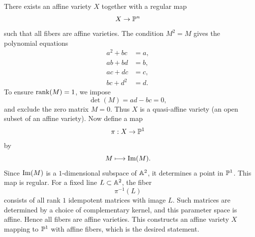 \begin{theorem}{
    There exists an affine variety $X$ together with a regular map
    \[
        X \to \pp^n
    \]
    such that all fibers are affine varieties.
}
    The condition $M^2 = M$ gives the polynomial equations
    \begin{align*}
        a^2 + bc &= a,\\
        ab + bd &= b,\\
        ac + dc &= c,\\
        bc + d^2 &= d.
    \end{align*}
    To ensure $\rank(M)=1$, we impose
    \[
        \det(M) = ad - bc = 0,
    \]
    and exclude the zero matrix $M=0$.
    Thus $X$ is a quasi-affine variety (an open subset of an affine variety).
    Now define a map
    \[
        \pi : X \to \pp^1
    \]
    by
    \[
        M \longmapsto \ima(M).
    \]
    Since $\ima(M)$ is a $1$-dimensional subspace of $\aa^2$, it determines a point in $\pp^1$.
    This map is regular.
    For a fixed line $L\subset \aa^2$, the fiber
    \[
        \pi^{-1}(L)
    \]
    consists of all rank $1$ idempotent matrices with image $L$.
    Such matrices are determined by a choice of complementary kernel, and this parameter space is affine.
    Hence all fibers are affine varieties.
    This constructs an affine variety $X$ mapping to $\pp^1$ with affine fibers, which is the desired statement.
\end{theorem}